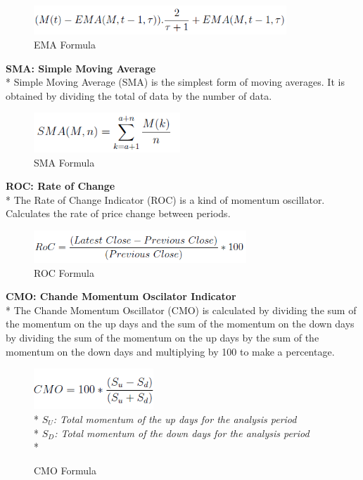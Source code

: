 \documentclass[]{article}
\begin{document}
\begin{figure}[H]
\begin{center}
   \includegraphics[width=95mm,scale=0.8]{assets/formulas/ema.png}
   \caption{EMA Formula}
\end{center}
\end{figure}
\noindent
\textbf{SMA: Simple Moving Average} \\*
Simple Moving Average (SMA) is the simplest form of moving averages. It is obtained by dividing the total of data by the number of data.
\begin{figure}[H]
\begin{center}
   \includegraphics[width=55mm,scale=0.8]{assets/formulas/sma.png}
   \caption{SMA Formula}
\end{center}
\end{figure}
\noindent
\textbf{ROC: Rate of Change}\\*
The Rate of Change Indicator (ROC) is a kind of momentum oscillator. Calculates the rate of price change between periods.
\begin{figure}[H]
\begin{center}
   \includegraphics[width=80mm,scale=0.8]{assets/formulas/roc.png}
   \caption{ROC Formula}
\end{center}
\end{figure}
\noindent
\textbf{CMO: Chande Momentum Oscilator Indicator} \\*
The Chande Momentum Oscillator (CMO) is calculated by dividing the sum of the momentum on the up days and the sum of the momentum on the down days by dividing the sum of the momentum on the up days by the sum of the momentum on the down days and multiplying by 100 to make a percentage.
\begin{figure}[H]
\begin{center}
   \includegraphics[width=45mm,scale=0.8]{assets/formulas/cmo.png}\\*
   \textit{$S_U$: Total momentum of the up days for the analysis period}\vspace{0.1cm}\\*
   \textit{$S_D$: Total momentum of the down days for the analysis period}\vspace{0.2cm}\\*
   \caption{CMO Formula}
\end{center}
\end{figure}
\end{document}
